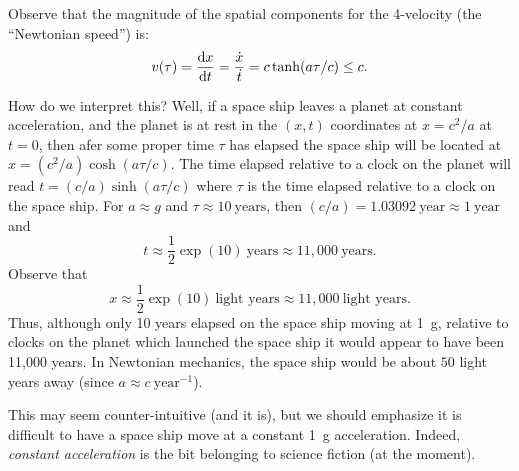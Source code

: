 \begin{remark}
  Observe that the magnitude of the spatial components for the
  4-velocity (the ``Newtonian speed'') is:
  \begin{equation}
v(\tau) = \frac{\mathrm{d} x}{\mathrm{d} t} = \frac{\dot{x}}{\dot{t}} = c\tanh(a\tau/c)\leq c.
  \end{equation}
\end{remark}

How do we interpret this? Well, if a space ship leaves a planet at
constant acceleration, and the planet is at rest in the $(x,t)$
coordinates at $x=c^{2}/a$ at $t=0$, then afer some proper time $\tau$
has elapsed the space ship will be located at $x=(c^{2}/a)\cosh(a\tau/c)$.
The time elapsed relative to a clock on the planet will read $t=(c/a)\sinh(a\tau/c)$
where $\tau$ is the time elapsed relative to a clock on the space ship.
For $a\approx g$ and $\tau\approx 10~\mbox{years}$, then $(c/a)=1.03092~\mbox{year}\approx 1~\mbox{year}$
and
\begin{equation}
t\approx\frac{1}{2}\exp(10)~\mbox{years}\approx 11,000~\mbox{years}.
\end{equation}
Observe that
\begin{equation}
x\approx\frac{1}{2}\exp(10)~\mbox{light years}\approx11,000~\mbox{light years}.
\end{equation}
Thus, although only 10 years elapsed on the space ship moving at 1~g,
relative to clocks on the planet which launched the space ship it would
appear to have been 11,000 years. In Newtonian mechanics, the space ship
would be about $50$ light years away (since $a\approx c~\mbox{year}^{-1}$).

\begin{remark}
This may seem counter-intuitive (and it is), but we should emphasize it
is difficult to have a space ship move at a constant 1~g acceleration.
Indeed, \emph{constant acceleration} is the bit belonging to science
fiction (at the moment).
\end{remark}

